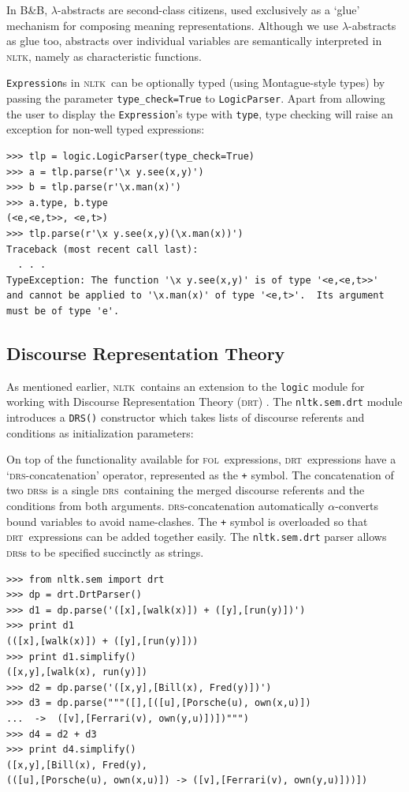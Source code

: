\documentclass[11pt, a4paper]{article}
\newcommand{\BB}{\textsc{B{\small\&}B}}
\newcommand{\DRS}{\textsc{drs}}
\newcommand{\DRT}{\textsc{drt}}
\newcommand{\FOL}{\textsc{fol}}
\newcommand{\NLTK}{\textsc{nltk}}
\begin{document}
In \BB, $\lambda$-abstracts are second-class citizens, used
exclusively as a `glue' mechanism for composing meaning
representations. Although we use $\lambda$-abstracts as glue too,
abstracts over individual variables are semantically interpreted in \NLTK, namely as
characteristic functions.

\texttt{Expression}s in \NLTK\ can be optionally typed (using
Montague-style types) by passing the parameter \texttt{type\_check=True} to
\texttt{LogicParser}.  Apart from allowing the user to display the
\texttt{Expression}'s type with \texttt{type}, type checking will
raise an exception for non-well typed expressions:
\begin{Verbatim}
>>> tlp = logic.LogicParser(type_check=True)
>>> a = tlp.parse(r'\x y.see(x,y)')
>>> b = tlp.parse(r'\x.man(x)')
>>> a.type, b.type
(<e,<e,t>>, <e,t>)
>>> tlp.parse(r'\x y.see(x,y)(\x.man(x))')
Traceback (most recent call last):
  . . .
TypeException: The function '\x y.see(x,y)' is of type '<e,<e,t>>' 
and cannot be applied to '\x.man(x)' of type '<e,t>'.  Its argument 
must be of type 'e'.
\end{Verbatim}

\subsection{Discourse Representation Theory}
As mentioned earlier, \NLTK\ contains an extension to the
\texttt{logic} module for working with Discourse Representation Theory
(\DRT) \citep{KampReyle}.  The \texttt{nltk.sem.drt} module introduces
a \texttt{DRS()} constructor which takes lists of discourse referents
and conditions as initialization parameters:
\vspace{-2ex}

On top of the functionality available for \FOL\
expressions, \DRT\ expressions have a `\DRS-concatenation' operator,
represented as the \texttt{+} symbol.  The concatenation of two \DRS s
is a single \DRS\ containing the merged discourse referents and the
conditions from both arguments.  \DRS-concatenation automatically
$\alpha$-converts bound variables to avoid name-clashes.  The
\texttt{+} symbol is overloaded so that \DRT\ expressions can be added
together easily.  The \texttt{nltk.sem.drt} parser allows \DRS s to be
specified succinctly as strings.
\begin{Verbatim}
>>> from nltk.sem import drt
>>> dp = drt.DrtParser()
>>> d1 = dp.parse('([x],[walk(x)]) + ([y],[run(y)])')
>>> print d1
(([x],[walk(x)]) + ([y],[run(y)]))
>>> print d1.simplify()
([x,y],[walk(x), run(y)])
>>> d2 = dp.parse('([x,y],[Bill(x), Fred(y)])')
>>> d3 = dp.parse("""([],[([u],[Porsche(u), own(x,u)])
...  ->  ([v],[Ferrari(v), own(y,u)])])""")
>>> d4 = d2 + d3
>>> print d4.simplify()
([x,y],[Bill(x), Fred(y),
(([u],[Porsche(u), own(x,u)]) -> ([v],[Ferrari(v), own(y,u)]))])
\end{Verbatim}
\end{document}
